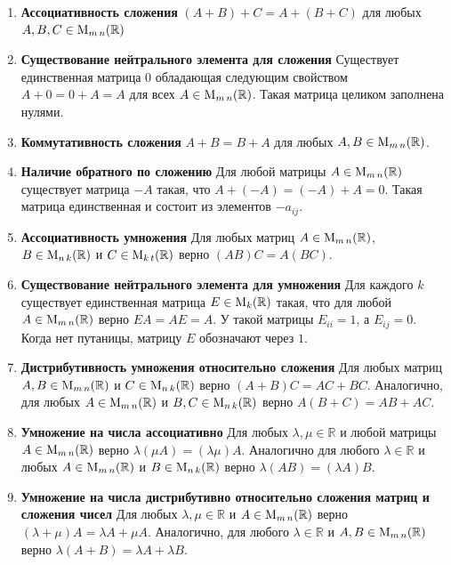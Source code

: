 \begin{enumerate}
\item {\bf Ассоциативность сложения}
$(A + B) + C = A + (B + C)$ для любых $A,B,C\in \operatorname{M}_{m\,n}(\mathbb R)$

\item {\bf Существование нейтрального элемента для сложения}
Существует единственная матрица $0$ обладающая следующим свойством $A + 0 = 0 + A = A$ для всех $A\in\operatorname{M}_{m\,n}(\mathbb R)$.
Такая матрица целиком заполнена нулями.

\item {\bf Коммутативность сложения}
$A + B = B + A$ для любых $A,B\in\operatorname{M}_{m\,n}(\mathbb R)$.

\item {\bf Наличие обратного по сложению}
Для любой матрицы $A\in\operatorname{M}_{m\,n}(\mathbb R)$ существует матрица $-A$ такая, что $A + (-A) = (-A) + A = 0$.
Такая матрица единственная и состоит из элементов $-a_{ij}$.

\item {\bf Ассоциативность умножения}
Для любых матриц $A\in\operatorname{M}_{m\,n}(\mathbb R)$, $B\in\operatorname{M}_{n\,k}(\mathbb R)$ и $C\in\operatorname{M}_{k\,t}(\mathbb R)$ верно $(AB)C = A(BC)$.

\item {\bf Существование нейтрального элемента для умножения}
Для каждого $k$ существует единственная матрица $E\in\operatorname{M}_{k}(\mathbb R)$ такая, что для любой $A\in\operatorname{M}_{m\,n}(\mathbb R)$ верно $E A = A E = A$.
У такой матрицы $E_{ii} = 1$, а $E_{ij} = 0$.
Когда нет путаницы, матрицу $E$ обозначают через $1$.

\item {\bf Дистрибутивность умножения относительно сложения}
Для любых матриц $A,B\in\operatorname{M}_{m\,n}(\mathbb R)$ и $C\in\operatorname{M}_{n\,k}(\mathbb R)$ верно $(A + B)C = AC + B C$.
Аналогично, для любых $A\in\operatorname{M}_{m\,n}(\mathbb R)$ и $B,C\in\operatorname{M}_{n\,k}(\mathbb R)$ верно $A(B+C) = AB + AC$.

\item {\bf Умножение на числа ассоциативно}
Для любых $\lambda,\mu \in\mathbb R$ и любой матрицы $A\in\operatorname{M}_{m\,n}(\mathbb R)$ верно $\lambda(\mu A) = (\lambda \mu) A$.
Аналогично для любого $\lambda \in \mathbb R$ и любых $A\in\operatorname{M}_{m\,n}(\mathbb R)$ и $B\in \operatorname{M}_{n\,k}(\mathbb R)$ верно $\lambda(AB) = (\lambda A) B$.

\item {\bf Умножение на числа дистрибутивно относительно сложения матриц и сложения чисел}
Для любых $\lambda,\mu\in \mathbb R$ и $A\in \operatorname{M}_{m\,n}(\mathbb R)$ верно $(\lambda + \mu)A = \lambda A +\mu A$.
Аналогично, для любого $\lambda\in\mathbb R$ и $A,B\in\operatorname{M}_{m\,n}(\mathbb R)$ верно $\lambda(A+B) = \lambda A + \lambda B$.


\end{enumerate}
